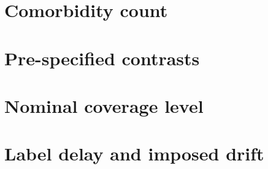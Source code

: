 \section*{Comorbidity count}


\section*{Pre-specified contrasts}


\section*{Nominal coverage level}


\section*{Label delay and imposed drift}



